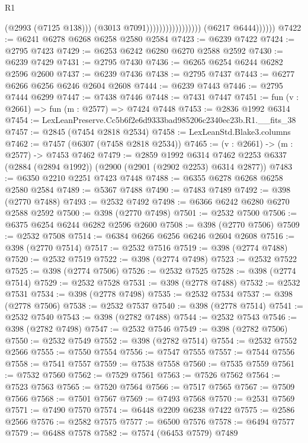 \begin{lexlean}{R1}
\begin{coremodule}
                                                (@2993 (@7125 @138)))
                                              (@3013 @7091)))))))))))))))))
              (@6217 @6444))))))
@7422 := @6241 @6278 @6268 @6258 @2580 @2584
@7423 := @6239 @7422
@7424 := @2795 @7423
@7429 := @6253 @6242 @6280 @6270 @2588 @2592
@7430 := @6239 @7429
@7431 := @2795 @7430
@7436 := @6265 @6254 @6244 @6282 @2596 @2600
@7437 := @6239 @7436
@7438 := @2795 @7437
@7443 := @6277 @6266 @6256 @6246 @2604 @2608
@7444 := @6239 @7443
@7446 := @2795 @7444 @6299
@7447 := @7438 @7446
@7448 := @7431 @7447
@7451 := fun (v : @2661) => fun (m : @2577) => @7424 @7448
@7453 := @2836 @1992 @6314
@7454 := LexLeanPreserve.Cc5b6f2e6d9333bad985206c2340ec23b.R1.__fits_38
@7457 := @2845 (@7454 @2818 @2534)
@7458 := LexLeanStd.Blake3.columns
@7462 := @7457 (@6307 (@7458 @2818 @2534))
@7465 := (v : @2661) -> (m : @2577) -> @7453 @7462
@7479 := @2859
    @1992
    @6314
    @7462
    @2253
    @6337
    (@2884 (@2894 @1992))
    (@2900 (@2901 (@2902 @2253) @6314 @2877))
@7483 := @6350 @2210 @2251 @7423 @7448
@7488 := @6355 @6278 @6268 @6258 @2580 @2584
@7489 := @5367 @7488
@7490 := @7483 @7489
@7492 := @398 (@2770 @7488)
@7493 := @2532 @7492
@7498 := @6366 @6242 @6280 @6270 @2588 @2592
@7500 := @398 (@2770 @7498)
@7501 := @2532 @7500
@7506 := @6375 @6254 @6244 @6282 @2596 @2600
@7508 := @398 (@2770 @7506)
@7509 := @2532 @7508
@7514 := @6384 @6266 @6256 @6246 @2604 @2608
@7516 := @398 (@2770 @7514)
@7517 := @2532 @7516
@7519 := @398 (@2774 @7488)
@7520 := @2532 @7519
@7522 := @398 (@2774 @7498)
@7523 := @2532 @7522
@7525 := @398 (@2774 @7506)
@7526 := @2532 @7525
@7528 := @398 (@2774 @7514)
@7529 := @2532 @7528
@7531 := @398 (@2778 @7488)
@7532 := @2532 @7531
@7534 := @398 (@2778 @7498)
@7535 := @2532 @7534
@7537 := @398 (@2778 @7506)
@7538 := @2532 @7537
@7540 := @398 (@2778 @7514)
@7541 := @2532 @7540
@7543 := @398 (@2782 @7488)
@7544 := @2532 @7543
@7546 := @398 (@2782 @7498)
@7547 := @2532 @7546
@7549 := @398 (@2782 @7506)
@7550 := @2532 @7549
@7552 := @398 (@2782 @7514)
@7554 := @2532 @7552 @2566
@7555 := @7550 @7554
@7556 := @7547 @7555
@7557 := @7544 @7556
@7558 := @7541 @7557
@7559 := @7538 @7558
@7560 := @7535 @7559
@7561 := @7532 @7560
@7562 := @7529 @7561
@7563 := @7526 @7562
@7564 := @7523 @7563
@7565 := @7520 @7564
@7566 := @7517 @7565
@7567 := @7509 @7566
@7568 := @7501 @7567
@7569 := @7493 @7568
@7570 := @2531 @7569
@7571 := @7490 @7570
@7574 := @6448 @2209 @6238 @7422
@7575 := @2586 @2566
@7576 := @2582 @7575
@7577 := @6500 @7576
@7578 := @6494 @7577
@7579 := @6488 @7578
@7582 := @7574 (@6453 @7579) @7489

\end{coremodule}
\end{lexlean}
